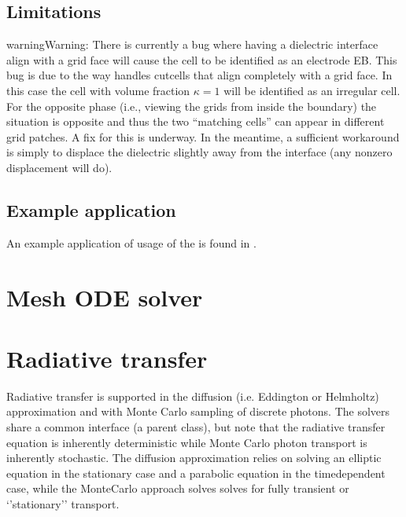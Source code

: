 \documentclass[letterpaper,10pt,english]{sphinxmanual}
\begin{document}
\subsection{Limitations}
\label{\detokenize{Solvers/Electrostatics:limitations}}
\begin{sphinxadmonition}{warning}{Warning:}
\sphinxAtStartPar
There is currently a bug where having a dielectric interface align  with a grid face will cause the cell to be identified as an electrode EB.
This bug is due to the way  handles cut\sphinxhyphen{}cells that align completely with a grid face.
In this case the cell with volume fraction \(\kappa = 1\) will be identified as an irregular cell.
For the opposite phase (i.e., viewing the grids from inside the boundary) the situation is opposite and thus the two “matching cells” can appear in different grid patches.
A fix for this is underway.
In the meantime, a sufficient workaround is simply to displace the dielectric slightly away from the interface (any non\sphinxhyphen{}zero displacement will do).
\end{sphinxadmonition}


\subsection{Example application}
\label{\detokenize{Solvers/Electrostatics:example-application}}
\sphinxAtStartPar
An example application of usage of the  is found in {\hyperref[\detokenize{Applications/ElectrostaticsModel:chap-electrostaticsmodel}]{}}.

\sphinxstepscope


\section{Mesh ODE solver}
\label{\detokenize{Solvers/MeshODESolver:mesh-ode-solver}}\label{\detokenize{Solvers/MeshODESolver:chap-meshodesolver}}\label{\detokenize{Solvers/MeshODESolver::doc}}
\sphinxstepscope


\section{Radiative transfer}
\label{\detokenize{Solvers/RTE:radiative-transfer}}\label{\detokenize{Solvers/RTE:chap-radiativetransfer}}\label{\detokenize{Solvers/RTE::doc}}
\sphinxAtStartPar
Radiative transfer is supported in the diffusion (i.e. Eddington or Helmholtz) approximation and with Monte Carlo sampling of discrete photons.
The solvers share a common interface (a parent class), but note that the radiative transfer equation is inherently deterministic while Monte Carlo photon transport is inherently stochastic.
The diffusion approximation relies on solving an elliptic equation in the stationary case and a parabolic equation in the time\sphinxhyphen{}dependent case, while the Monte\sphinxhyphen{}Carlo approach solves solves for fully transient or ‘’stationary’’ transport.
\end{document}
